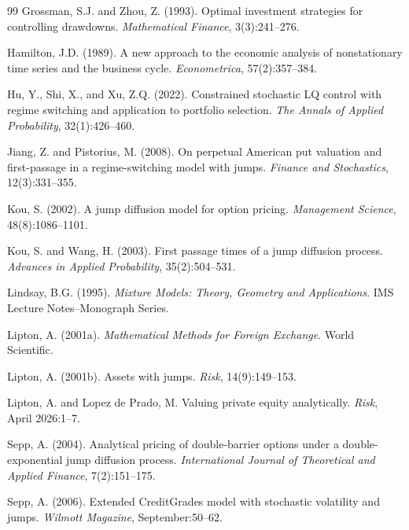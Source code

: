 \documentclass[11pt,a4paper]{article}
\numberwithin{equation}{section}
\begin{document}
\begin{thebibliography}{99}
Grossman, S.J. and Zhou, Z. (1993). Optimal investment strategies for controlling drawdowns. \textit{Mathematical Finance}, 3(3):241--276.

Hamilton, J.D. (1989). A new approach to the economic analysis of nonstationary time series and the business cycle. \textit{Econometrica}, 57(2):357--384.

Hu, Y., Shi, X., and Xu, Z.Q. (2022). Constrained stochastic LQ control with regime switching and application to portfolio selection. \textit{The Annals of Applied Probability}, 32(1):426--460.

Jiang, Z. and Pistorius, M. (2008). On perpetual American put valuation and first-passage in a regime-switching model with jumps. \textit{Finance and Stochastics}, 12(3):331--355.

Kou, S. (2002). A jump diffusion model for option pricing. \textit{Management Science}, 48(8):1086--1101.

Kou, S. and Wang, H. (2003). First passage times of a jump diffusion process. \textit{Advances in Applied Probability}, 35(2):504--531.

Lindsay, B.G. (1995). \textit{Mixture Models: Theory, Geometry and Applications}. IMS Lecture Notes--Monograph Series.

Lipton, A. (2001a). \textit{Mathematical Methods for Foreign Exchange}. World Scientific.

Lipton, A. (2001b). Assets with jumps. \textit{Risk}, 14(9):149--153.

Lipton, A. and Lopez de Prado, M. Valuing private equity analytically. \textit{Risk}, April 2026:1--7.

Sepp, A. (2004). Analytical pricing of double-barrier options under a double-exponential jump diffusion process. \textit{International Journal of Theoretical and Applied Finance}, 7(2):151--175.

Sepp, A. (2006). Extended CreditGrades model with stochastic volatility and jumps. \textit{Wilmott Magazine}, September:50--62.


\end{thebibliography}
\end{document}
